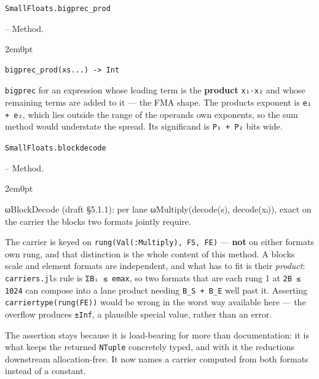 \par\medskip\noindent\begin{minipage}{\linewidth}
\hypertarget{646269805905669936}{\texttt{SmallFloats.bigprec\_\allowbreak{}prod}}  -- {Method.}
\nopagebreak
\begin{adjustwidth}{2em}{0pt}


\begin{verbatim}
bigprec_prod(xs...) -> Int
\end{verbatim}

\texttt{bigprec} for an expression whose leading term is the \textbf{product} \texttt{x₁·x₂} and whose remaining terms are added to it — the FMA shape. The product{\textquotesingle}s exponent is \texttt{e₁ + e₂}, which lies outside the range of the operands{\textquotesingle} own exponents, so the sum method would understate the spread. Its significand is \texttt{P₁ + P₂} bits wide.



\end{adjustwidth}
\end{minipage}
\par\medskip

\par\medskip\noindent\begin{minipage}{\linewidth}
\hypertarget{14780784727942474206}{\texttt{SmallFloats.blockdecode}}  -- {Method.}
\nopagebreak
\begin{adjustwidth}{2em}{0pt}

ωBlockDecode (draft §5.1.1): per lane ωMultiply(decode(s), decode(xᵢ)), exact on the carrier the block{\textquotesingle}s two formats jointly require.

The carrier is keyed on \texttt{rung(\allowbreak{}Val(\allowbreak{}:Multiply), FS, FE)} — \textbf{not} on either format{\textquotesingle}s own rung, and that distinction is the whole content of this method. A block{\textquotesingle}s scale and element formats are independent, and what has to fit is their \emph{product}: \texttt{carriers.jl}{\textquotesingle}s rule is \texttt{ΣBᵢ ≤ emax}, so two formats that are each rung 1 at \texttt{2B ≤ 1024} can compose into a lane product needing \texttt{B\_\allowbreak{}S + B\_\allowbreak{}E} well past it. Asserting \texttt{carriertype(rung(FE))} would be wrong in the worst way available here — the overflow produces \texttt{±Inf}, a plausible special value, rather than an error.

The assertion stays because it is load-bearing for more than documentation: it is what keeps the returned \texttt{NTuple} concretely typed, and with it the reductions downstream allocation-free. It now names a carrier computed from both formats instead of a constant.



\end{adjustwidth}
\end{minipage}
\par\medskip

